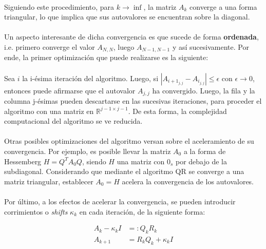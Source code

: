 \documentclass[12pt, twocolumn]{article}
\begin{document}
	\paragraph{} Siguiendo este procedimiento, para $k\to\inf$, la matriz $A_{k}$ converge a una forma triangular, lo que implica que sus autovalores se encuentran sobre la diagonal.
	
	\paragraph{} Un aspecto interesante de dicha convergencia es que sucede de forma \textbf{ordenada}, i.e. primero converge el valor $A_{N,N}$, luego $A_{N-1,N-1}$ y así sucesivamente. Por ende, la primer optimización que puede realizarse es la siguiente: 
	
	\paragraph{} Sea $i$ la i-ésima iteración del algoritmo. Luego, si $|A_{i+1_{j,j}} -A_{i_{j,j}}| \le \epsilon$ con $\epsilon \to 0$, entonces puede afirmarse que el autovalor $A_{j,j}$ ha convergido. Luego, la fila y la columna j-ésimas pueden descartarse en las sucesivas iteraciones, para proceder el algoritmo con una matriz en $\mathbb{R}^{j-1 \times j-1}$. De esta forma, la complejidad computacional del algoritmo se ve reducida.
	
	\paragraph{} Otras posibles optimizaciones del algoritmo versan sobre el aceleramiento de su convergencia. Por ejemplo, es posible llevar la matriz $A_{0}$ a la forma de Hessemberg $H = Q^{T}A_{0}Q$, siendo $H$ una matriz con $0_{s}$ por debajo de la subdiagonal. Considerando que mediante el algoritmo QR se converge a una matriz triangular, establecer $A_{0} = H$ acelera la convergencia de los autovalores.
	
	\paragraph{} Por último, a los efectos de acelerar la convergencia, se pueden introducir corrimientos o \textit{shifts} $\kappa_{k}$ en cada iteración, de la siguiente forma:
	
	\begin{align}
		A_{k} - \kappa_{k}I &=: Q_{k}R_{k} \\
		A_{k+1} &= R_{k}Q_{k} + \kappa_{k}I 
	\end{align}
	
\end{document}
